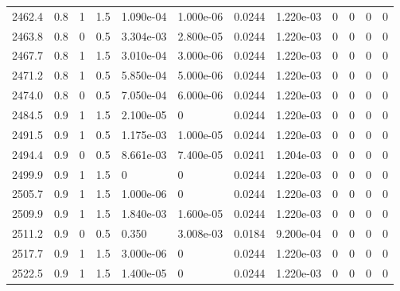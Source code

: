 \documentclass[preview]{standalone}
\begin{document}
{{{{{{{{{{{{{{\begin{tabular}{L{1.2cm}C{1.2cm} C{0.3cm}C{0.5cm} C{1.4cm}C{1.4cm} C{1.4cm}C{1.4cm} C{1.6cm}C{1.6cm} C{1.6cm}C{1.6cm}}
  2462.4  &   0.8  & 1     & 1.5 &  1.090e-04  & 1.000e-06  &  0.0244&   1.220e-03& 0 & 0   &  0 & 0  \\ 
  2463.8  &   0.8  & 0     & 0.5 &  3.304e-03  & 2.800e-05  &  0.0244&   1.220e-03& 0 & 0   &  0 & 0  \\ 
  2467.7  &   0.8  & 1     & 1.5 &  3.010e-04  & 3.000e-06  &  0.0244&   1.220e-03& 0 & 0   &  0 & 0  \\ 
  2471.2  &   0.8  & 1     & 0.5 &  5.850e-04  & 5.000e-06  &  0.0244&   1.220e-03& 0 & 0   &  0 & 0  \\ 
  2474.0  &   0.8  & 0     & 0.5 &  7.050e-04  & 6.000e-06  &  0.0244&   1.220e-03& 0 & 0   &  0 & 0  \\ 
  2484.5  &   0.9  & 1     & 1.5 &  2.100e-05  & 0  &  0.0244&   1.220e-03& 0 & 0   &  0 & 0  \\ 
  2491.5  &   0.9  & 1     & 0.5 &  1.175e-03  & 1.000e-05  &  0.0244&   1.220e-03& 0 & 0   &  0 & 0  \\ 
  2494.4  &   0.9  & 0     & 0.5 &  8.661e-03  & 7.400e-05  &  0.0241&   1.204e-03& 0 & 0   &  0 & 0  \\ 
  2499.9  &   0.9  & 1     & 1.5 &  0  & 0  &  0.0244&   1.220e-03& 0 & 0   &  0 & 0  \\ 
  2505.7  &   0.9  & 1     & 1.5 &  1.000e-06  & 0  &  0.0244&   1.220e-03& 0 & 0   &  0 & 0  \\ 
  2509.9  &   0.9  & 1     & 1.5 &  1.840e-03  & 1.600e-05  &  0.0244&   1.220e-03& 0 & 0   &  0 & 0  \\ 
  2511.2  &   0.9  & 0     & 0.5 &  0.350  & 3.008e-03  &  0.0184&   9.200e-04& 0 & 0   &  0 & 0  \\ 
  2517.7  &   0.9  & 1     & 1.5 &  3.000e-06  & 0  &  0.0244&   1.220e-03& 0 & 0   &  0 & 0  \\ 
  2522.5  &   0.9  & 1     & 1.5 &  1.400e-05  & 0  &  0.0244&   1.220e-03& 0 & 0   &  0 & 0  \\ 
\hline 
\end{tabular} 

}}}}}}}}}}}}}}
\end{document}

